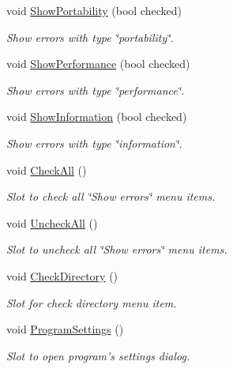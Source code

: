 \begin{DoxyCompactItemize}
void \hyperlink{class_main_window_aa649c6776f31c90f143ef78f99fbfebf}{Show\-Portability} (bool checked)
\begin{DoxyCompactList}\small\item\em Show errors with type \char`\"{}portability\char`\"{}. \end{DoxyCompactList}\item 
void \hyperlink{class_main_window_a7ae044bfd0a5782bf9815b7280e00fdd}{Show\-Performance} (bool checked)
\begin{DoxyCompactList}\small\item\em Show errors with type \char`\"{}performance\char`\"{}. \end{DoxyCompactList}\item 
void \hyperlink{class_main_window_a4f579c723aeb56a1d7cf98741b3655a6}{Show\-Information} (bool checked)
\begin{DoxyCompactList}\small\item\em Show errors with type \char`\"{}information\char`\"{}. \end{DoxyCompactList}\item 
void \hyperlink{class_main_window_af1056385bc7552d006ef22753feba76f}{Check\-All} ()
\begin{DoxyCompactList}\small\item\em Slot to check all \char`\"{}\-Show errors\char`\"{} menu items. \end{DoxyCompactList}\item 
void \hyperlink{class_main_window_abed24502778dad5e5e31db4d0b8a9722}{Uncheck\-All} ()
\begin{DoxyCompactList}\small\item\em Slot to uncheck all \char`\"{}\-Show errors\char`\"{} menu items. \end{DoxyCompactList}\item 
void \hyperlink{class_main_window_aa20cd54c6e7727c16c6cbdb864ebcada}{Check\-Directory} ()
\begin{DoxyCompactList}\small\item\em Slot for check directory menu item. \end{DoxyCompactList}\item 
void \hyperlink{class_main_window_a0b66ee6ff62e63b0e6896656d6fb532f}{Program\-Settings} ()
\begin{DoxyCompactList}\small\item\em Slot to open program's settings dialog. \end{DoxyCompactList}\item 

\end{DoxyCompactItemize}

